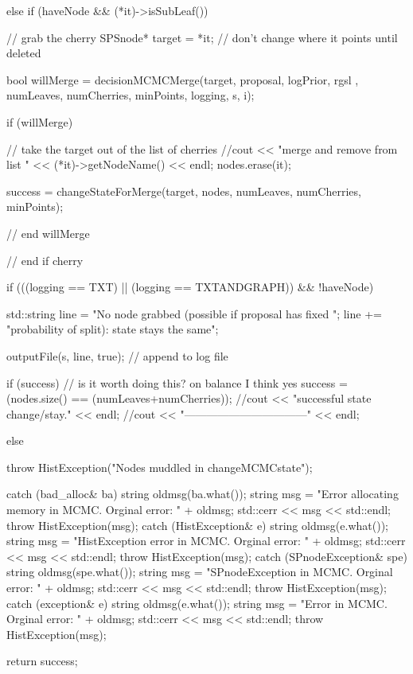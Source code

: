 \begin{DoxyCode}
{{        else if (haveNode && (*it)->isSubLeaf()) {

            // grab the cherry
            SPSnode* target = *it; // don't change where it points until
       deleted

            bool willMerge = decisionMCMCMerge(target, proposal, logPrior, rgsl
      ,
                            numLeaves, numCherries, minPoints, logging, s, i);

            if (willMerge) {
                // take the target out of the list of cherries
          //cout << "merge and remove from list " << (*it)->getNodeName() <<
       endl;
               nodes.erase(it);

               success = changeStateForMerge(target,
                            nodes, numLeaves, numCherries, minPoints);

            } // end willMerge
        } // end if cherry


        if (((logging == TXT) || (logging == TXTANDGRAPH)) && !haveNode) {

            std::string line = "No node grabbed (possible if proposal has fixed
       ";
            line += "probability of split): state stays the same";

            outputFile(s, line, true); // append to log file
        }

        if (success) {
            // is it worth doing this?  on balance I think yes
            success = (nodes.size() == (numLeaves+numCherries));
            //cout << "successful state change/stay." << endl;
        //cout << "---------------------------------" << endl;
        }
        
        else {
            throw HistException("Nodes muddled in changeMCMCstate");

        }
    }
    catch (bad_alloc& ba) {
        string oldmsg(ba.what());
        string msg = "Error allocating memory in MCMC.  Orginal error: "
                                     + oldmsg;
        std::cerr << msg << std::endl;
        throw HistException(msg);
    }
    catch (HistException& e) {
        string oldmsg(e.what());
        string msg = "HistException error  in MCMC.  Orginal error: "
                                    + oldmsg;
        std::cerr << msg << std::endl;
        throw HistException(msg);
    }
    catch (SPnodeException& spe) {
        string oldmsg(spe.what());
        string msg = "SPnodeException  in MCMC.  Orginal error: "
                                    + oldmsg;
        std::cerr << msg << std::endl;
        throw HistException(msg);
    }
    catch (exception& e) {
        string oldmsg(e.what());
        string msg = "Error  in MCMC.  Orginal error: " + oldmsg;
        std::cerr << msg << std::endl;
        throw HistException(msg);
    }

    return success;
}
\end{DoxyCode}
